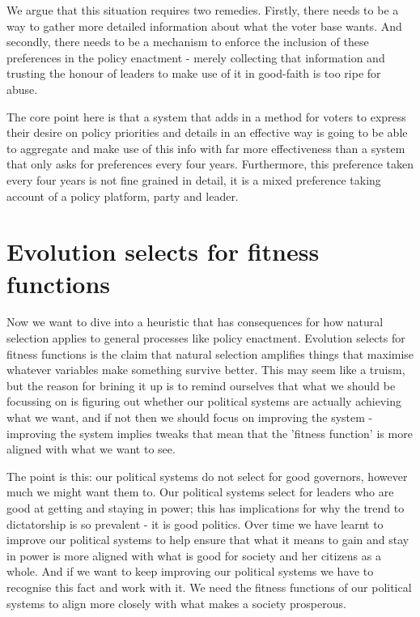 \documentclass[twoside]{article}
\begin{document}
We argue that this situation requires two remedies. Firstly, there needs to be a way to gather more detailed information about what the voter base wants. And secondly, there needs to be a mechanism to enforce the inclusion of these preferences in the policy enactment - merely collecting that information and trusting the honour of leaders to make use of it in good-faith is too ripe for abuse.

The core point here is that a system that adds in a method for voters to express their desire on policy priorities and details in an effective way is going to be able to aggregate and make use of this info with far more effectiveness than a system that only asks for preferences every four years. Furthermore, this preference taken every four years is not fine grained in detail, it is a mixed preference taking account of a policy platform, party and leader.

\section{Evolution selects for fitness functions}

Now we want to dive into a heuristic that has consequences for how natural selection applies to general processes like policy enactment. Evolution selects for fitness functions is the claim that natural selection amplifies things that maximise whatever variables make something survive better. This may seem like a truism, but the reason for brining it up is to remind ourselves that what we should be focussing on is figuring out whether our political systems are actually achieving what we want, and if not then we should focus on improving the system - improving the system implies tweaks that mean that the 'fitness function' is more aligned with what we want to see.

The point is this: our political systems do not select for good governors, however much we might want them to. Our political systems select for leaders who are good at getting and staying in power; this has implications for why the trend to dictatorship is so prevalent - it is good politics. Over time we have learnt to improve our political systems to help ensure that what it means to gain and stay in power is more aligned with what is good for society and her citizens as a whole. And if we want to keep improving our political systems we have to recognise this fact and work with it. We need the fitness functions of our political systems to align more closely with what makes a society prosperous.
\end{document}
